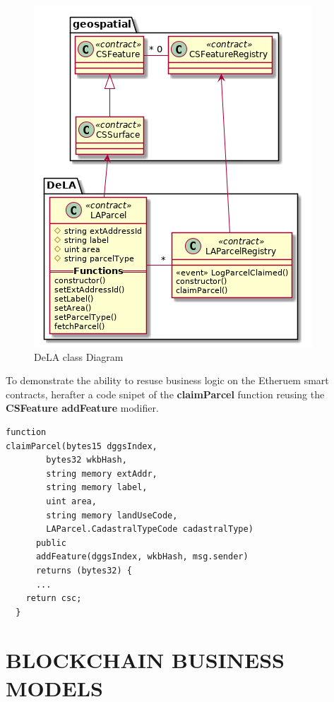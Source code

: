 \documentclass{isprs} %
\begin{document}
\begin{figure}[ht!]
\begin{center}
		\includegraphics[width=1.0\columnwidth]{figures/class-dela.png}
	\caption{DeLA class Diagram}
\label{fig:figure_dela_class}
\end{center}
\end{figure}

To demonstrate the ability to resuse business logic on the Etheruem smart contracts, herafter a code snipet of the \textbf{claimParcel} function reusing the \textbf{CSFeature addFeature} modifier.
\begin{verbatim}
function 
claimParcel(bytes15 dggsIndex,
		bytes32 wkbHash,
		string memory extAddr,
		string memory label,
		uint area,
		string memory landUseCode,
		LAParcel.CadastralTypeCode cadastralType)
      public 
      addFeature(dggsIndex, wkbHash, msg.sender)
      returns (bytes32) {
      ...
    return csc;
  }
\end{verbatim}

\newpage

\section{BLOCKCHAIN BUSINESS MODELS}\label{sec:BLOCKCHAIN BUSINESS MODELS}
\end{document}
